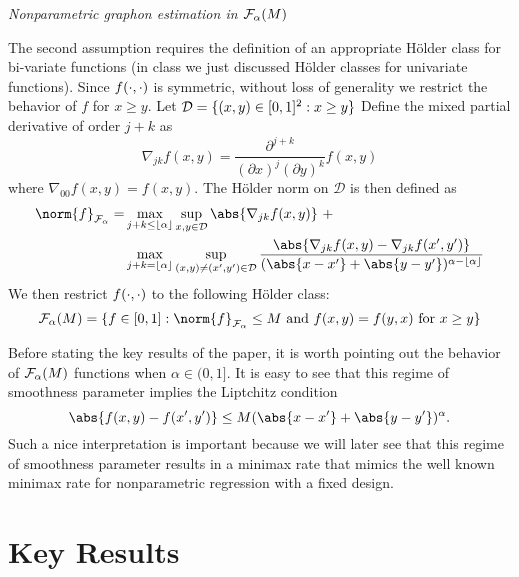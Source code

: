 \documentclass[11pt]{article}
\begin{document}
\begin{assump}\label{assump:holder}
\textit{Nonparametric graphon estimation in $\mathcal{F}_{\alpha}(M)$}

\noindent
The second assumption requires the definition of an appropriate H\"older class for bi-variate functions (in class we just discussed H\"older classes for univariate functions). Since $f(\cdot, \cdot)$ is symmetric, without loss of generality we restrict the behavior of $f$ for $x \geq y$. Let $\mathcal{D} = \{(x, y) \in [0, 1]^2 : x \geq y\}$ Define the mixed partial derivative of order $j + k$ as
\begin{equation}
\nabla_{jk} f(x, y) = \frac{\partial^{j+k}}{(\partial x)^j (\partial y)^k}f(x, y)
\end{equation}
where $\nabla_{00} f(x, y) = f(x, y)$. The H\"older norm on $\mathcal{D}$ is then defined as
\begin{equation}
\begin{aligned}
\norm{f}_{\mathcal{F}_{\alpha}} = &\max_{j + k \leq \floor{\alpha}} \sup_{x,y \in \mathcal{D}} \abs{\nabla_{jk}f(x, y)} \ + \\
& \max_{j + k = \floor{\alpha}} \sup_{(x, y) \neq (x', y') \in \mathcal{D}}
\frac{\abs{\nabla_{jk}f(x,y) - \nabla_{jk}f(x', y')}}{(\abs{x - x'} + \abs{y -y'})^{\alpha - \floor{\alpha}}}
\end{aligned}
\end{equation}
We then restrict $f(\cdot, \cdot)$ to the following H\"older class:
\begin{equation}
\holder = \set{f \in [0, 1] : \norm{f}_{\mathcal{F}_{\alpha}} \leq M \text{ and } f(x, y) = f(y, x) \text{ for } x \geq y}
\end{equation}
\end{assump}

Before stating the key results of the paper, it is worth pointing out the behavior of $\mathcal{F}_{\alpha}(M)$ functions when $\alpha \in (0, 1]$. It is easy to see that this regime of smoothness parameter implies the Liptchitz condition
\begin{equation}
\abs{f(x,y) - f(x', y')} \leq M (\abs{x - x'} + \abs{y - y'})^{\alpha}.
\end{equation}
Such a nice interpretation is important because we will later see that this regime of smoothness parameter results in a minimax rate that mimics the well known minimax rate for nonparametric regression with a fixed design.

\section{Key Results} \label{sec:key_results}
\end{document}
